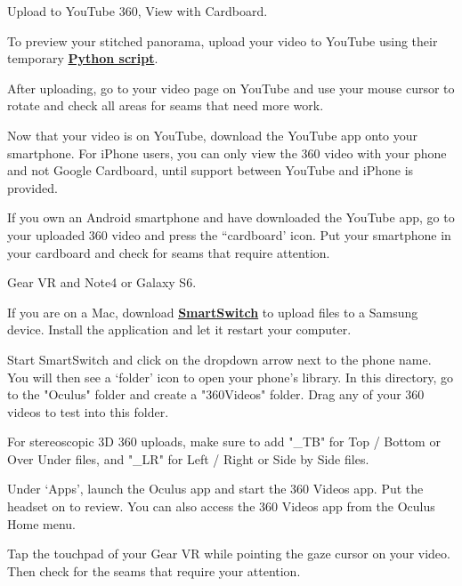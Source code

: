 \begin{fullwidth}
\clearpage
{\large Upload to YouTube 360, View with Cardboard. \par}

To preview your stitched panorama, upload your video to YouTube using their temporary \textbf{\href{https://www.youtube.com/watch?v=Z8VlD2rtACA}{Python script}}.

After uploading, go to your video page on YouTube and use your mouse cursor to rotate and check all areas for seams that need more work.

Now that your video is on YouTube, download the YouTube app onto your smartphone. For iPhone users, you can only view the 360 video with your phone and not Google Cardboard, until support between YouTube and iPhone is provided.

If you own an Android smartphone and have downloaded the YouTube app, go to your uploaded 360 video and press the “cardboard’ icon. Put your smartphone in your cardboard and check for seams that require attention.

{\large Gear VR and Note4 or Galaxy S6. \par}

If you are on a Mac, download \textbf{\href{https://www.dropbox.com/sh/8kqte3wtyt3vltu/AAAjUnNxtXhaxprWF8_q9zbCa?dl=0}{SmartSwitch}} to upload files to a Samsung device. Install the application and let it restart your computer.

Start SmartSwitch and click on the dropdown arrow next to the phone name. You will then see a ‘folder’ icon to open your phone's library. In this directory, go to the "Oculus" folder and create a "360Videos" folder. Drag any of your 360 videos to test into this folder.

\tip For stereoscopic 3D 360 uploads, make sure to add "\_TB" for Top / Bottom or Over Under files, and "\_LR" for Left / Right or Side by Side files.


Under ‘Apps’, launch the Oculus app and start the 360 Videos app. Put the headset on to review. You can also access the 360 Videos app from the Oculus Home menu.


Tap the touchpad of your Gear VR while pointing the gaze cursor on your video. Then check for the seams that require your attention.

\clearpage
\end{fullwidth}
